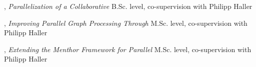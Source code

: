 \documentclass[9pt]{article}
\begin{document}
, {\em Parallelization of a Collaborative} 
\newline{}
\newline\noindent B.Sc. level, co-supervision with Philipp Haller
\medskip

, {\em Improving Parallel Graph Processing Through} 
\newline{}
\newline\noindent M.Sc. level, co-supervision with Philipp Haller
\medskip

, {\em Extending the Menthor Framework for Parallel} 
\newline{}
\newline\noindent M.Sc. level, co-supervision with Philipp Haller
\medskip
\end{document}
